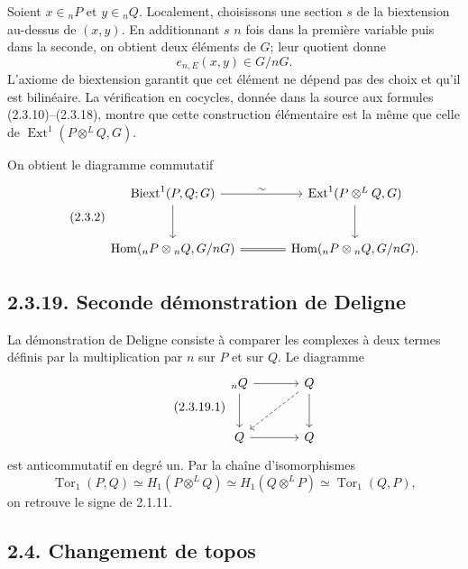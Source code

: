 \documentclass[11pt]{article}
\providecommand{\Tor}{\operatorname{Tor}}
\providecommand{\Hom}{\operatorname{Hom}}
\providecommand{\Ext}{\operatorname{Ext}}
\providecommand{\Biext}{\operatorname{Biext}}
\begin{document}
Soient \(x\in{}_nP\) et \(y\in{}_nQ\).  Localement, choisissons une section \(s\) de la biextension au-dessus de \((x,y)\).  En additionnant \(s\) \(n\) fois dans la première variable puis dans la seconde, on obtient deux éléments de \(G\); leur quotient donne
\begin{equation}\tag{2.3.1}
        e_{n,E}(x,y)\in G/nG.
\end{equation}
L'axiome de biextension garantit que cet élément ne dépend pas des choix et qu'il est bilinéaire.  La vérification en cocycles, donnée dans la source aux formules (2.3.10)--(2.3.18), montre que cette construction élémentaire est la même que celle de \(\Ext^1(P\otimes^LQ,G)\).

On obtient le diagramme commutatif
\begin{equation}\tag{2.3.2}
\begin{tikzcd}[column sep=large,row sep=large]
\Biext^1(P,Q;G)\arrow[r,"\sim"]\arrow[d]&\Ext^1(P\otimes^LQ,G)\arrow[d]\\
\Hom({}_nP\otimes{}_nQ,G/nG)\arrow[r,equal]&\Hom({}_nP\otimes{}_nQ,G/nG).
\end{tikzcd}
\end{equation}

\subsection*{2.3.19. Seconde démonstration de Deligne}

La démonstration de Deligne consiste à comparer les complexes à deux termes définis par la multiplication par \(n\) sur \(P\) et sur \(Q\).  Le diagramme
\begin{equation}\tag{2.3.19.1}
\begin{tikzcd}[column sep=large,row sep=large]
{}_nQ\arrow[r]\arrow[d]&Q\arrow[d]\arrow[dl,dashed]\\
Q\arrow[r]&Q
\end{tikzcd}
\end{equation}
est anticommutatif en degré un.  Par la chaîne d'isomorphismes
\[
        \Tor_1(P,Q)\simeq H_1(P\otimes^LQ)\simeq H_1(Q\otimes^LP)\simeq \Tor_1(Q,P),
\]
on retrouve le signe de 2.1.11.

\subsection*{2.4. Changement de topos}
\end{document}
